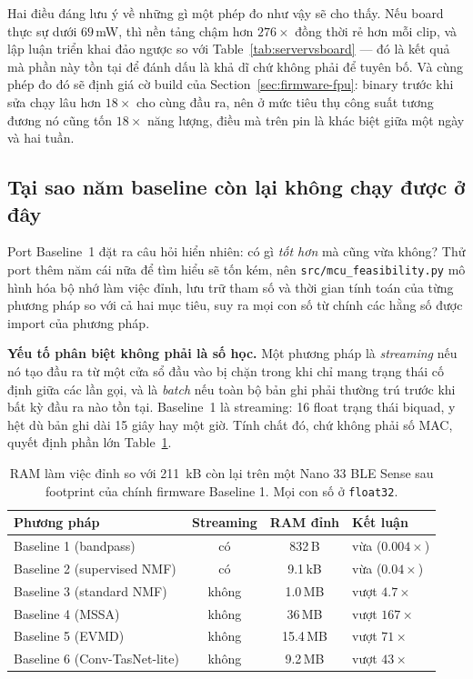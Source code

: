 \documentclass[11pt]{article}
\begin{document}
Hai điều đáng lưu ý về những gì một phép đo như vậy sẽ cho thấy. Nếu board
thực sự dưới $69$\,mW, thì nền tảng chậm hơn $276\times$ đồng thời rẻ hơn
mỗi clip, và lập luận triển khai đảo ngược so với
Table~\ref{tab:servervsboard} --- đó là kết quả mà phần này tồn tại để
đánh dấu là khả dĩ chứ không phải để tuyên bố. Và cùng phép đo đó sẽ định
giá cờ build của Section~\ref{sec:firmware-fpu}: binary trước khi sửa chạy
lâu hơn $18\times$ cho cùng đầu ra, nên ở mức tiêu thụ công suất tương
đương nó cũng tốn $18\times$ năng lượng, điều mà trên pin là khác biệt
giữa một ngày và hai tuần.

\subsection{Tại sao năm baseline còn lại không chạy được ở đây}
\label{sec:firmware-others}

Port Baseline~1 đặt ra câu hỏi hiển nhiên: có gì \emph{tốt hơn} mà cũng
vừa không? Thử port thêm năm cái nữa để tìm hiểu sẽ tốn kém, nên
\texttt{src/mcu\_feasibility.py} mô hình hóa bộ nhớ làm việc đỉnh, lưu
trữ tham số và thời gian tính toán của từng phương pháp so với cả hai mục
tiêu, suy ra mọi con số từ chính các hằng số được import của phương pháp.

\textbf{Yếu tố phân biệt không phải là số học.} Một phương pháp là
\emph{streaming} nếu nó tạo đầu ra từ một cửa sổ đầu vào bị chặn trong
khi chỉ mang trạng thái cố định giữa các lần gọi, và là \emph{batch} nếu
toàn bộ bản ghi phải thường trú trước khi bất kỳ đầu ra nào tồn tại.
Baseline~1 là streaming: 16 float trạng thái biquad, y hệt dù bản ghi dài
15 giây hay một giờ. Tính chất đó, chứ không phải số MAC, quyết định phần
lớn Table~\ref{tab:mcufeas}.

\begin{table}[H]
\centering
\caption{RAM làm việc đỉnh so với 211~kB còn lại trên một Nano 33 BLE Sense sau footprint của chính firmware Baseline 1. Mọi con số ở \texttt{float32}.}
\label{tab:mcufeas}
\begin{tabular}{@{}lccl@{}}
\toprule
Phương pháp & Streaming & RAM đỉnh & Kết luận \\
\midrule
Baseline 1 (bandpass)        & có   & 832\,B  & vừa ($0.004\times$) \\
Baseline 2 (supervised NMF)  & có   & 9.1\,kB & vừa ($0.04\times$) \\
Baseline 3 (standard NMF)    & không & 1.0\,MB & vượt $4.7\times$ \\
Baseline 4 (MSSA)            & không & 36\,MB  & vượt $167\times$ \\
Baseline 5 (EVMD)            & không & 15.4\,MB & vượt $71\times$ \\
Baseline 6 (Conv-TasNet-lite) & không & 9.2\,MB & vượt $43\times$ \\
\bottomrule
\end{tabular}
\end{table}
\end{document}
